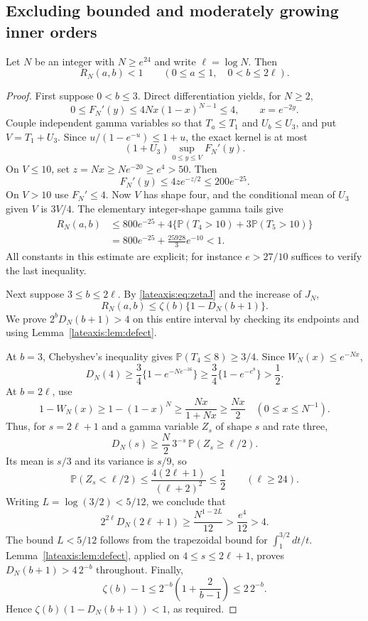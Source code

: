 \subsection{Excluding bounded and moderately growing inner orders}

\begin{lemma}\label{lateaxis:lem:exclude}
Let $N$ be an integer with $N\ge e^{24}$ and write $\ell=\log N$.
Then
\[
 R_N(a,b)<1\qquad(0\le a\le1,\quad 0<b\le2\ell).
\]
\end{lemma}
\begin{proof}
First suppose $0<b\le3$.  Direct differentiation yields, for $N\ge2$,
\[
 0\le F_N'(y)\le4Nx(1-x)^{N-1}\le4,
 \qquad x=e^{-2y}.
\]
Couple independent gamma variables so that $T_a\le T_1$ and
$U_b\le U_3$, and put $V=T_1+U_3$.  Since
$u/(1-e^{-u})\le1+u$, the exact kernel is at most
\[
 (1+U_3)\sup_{0\le y\le V}F_N'(y).
\]
On $V\le10$, set $z=Nx\ge Ne^{-20}\ge e^4>50$.  Then
\[
 F_N'(y)\le4z e^{-z/2}\le200e^{-25}.
\]
On $V>10$ use $F_N'\le4$.  Now $V$ has shape four, and the
conditional mean of $U_3$ given $V$ is $3V/4$.  The elementary
integer-shape gamma tails give
\begin{align*}
 R_N(a,b)
 &\le800e^{-25}+4\{\mathbb P(T_4>10)
                         +3\mathbb P(T_5>10)\}\\
 &=800e^{-25}+\frac{25928}{3}e^{-10}<1.
\end{align*}
All constants in this estimate are explicit; for instance $e>27/10$
suffices to verify the last inequality.

Next suppose $3\le b\le2\ell$.  By
\eqref{lateaxis:eq:zetaJ} and the increase of $J_N$,
\[
 R_N(a,b)\le\zeta(b)\{1-D_N(b+1)\}.
\]
We prove $2^bD_N(b+1)>4$ on this entire interval by checking its
endpoints and using Lemma~\ref{lateaxis:lem:defect}.

At $b=3$, Chebyshev's inequality gives
$\mathbb P(T_4\le8)\ge3/4$.  Since
$W_N(x)\le e^{-Nx}$,
\[
 D_N(4)\ge\frac34\{1-e^{-Ne^{-16}}\}
        \ge\frac34\{1-e^{-e^8}\}>\frac12.
\]
At $b=2\ell$, use
\[
 1-W_N(x)\ge1-(1-x)^N\ge\frac{Nx}{1+Nx}
                       \ge\frac{Nx}{2}\quad(0\le x\le N^{-1}).
\]
Thus, for $s=2\ell+1$ and a gamma variable $Z_s$ of shape $s$
and rate three,
\[
 D_N(s)\ge\frac N2\,3^{-s}\,\mathbb P(Z_s\ge\ell/2).
\]
Its mean is $s/3$ and its variance is $s/9$, so
\[
 \mathbb P(Z_s<\ell/2)
 \le\frac{4(2\ell+1)}{(\ell+2)^2}\le\frac12
 \qquad(\ell\ge24).
\]
Writing $L=\log(3/2)<5/12$, we conclude that
\[
 2^{2\ell}D_N(2\ell+1)
 \ge\frac{N^{1-2L}}{12}
 >\frac{e^4}{12}>4.
\]
The bound $L<5/12$ follows from the trapezoidal bound for
$\int_1^{3/2}dt/t$.  Lemma~\ref{lateaxis:lem:defect}, applied on
$4\le s\le2\ell+1$, proves $D_N(b+1)>4\,2^{-b}$ throughout.
Finally,
\[
 \zeta(b)-1\le2^{-b}\left(1+\frac2{b-1}\right)\le2\,2^{-b}.
\]
Hence $\zeta(b)(1-D_N(b+1))<1$, as required.
\end{proof}

